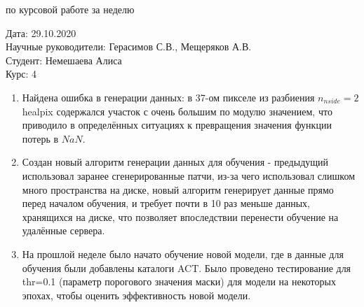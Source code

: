 \documentclass{article}
\begin{document}
\begin{center}{ по курсовой работе за неделю\\}\end{center}
Дата: 29.10.2020\\
Научные руководители: Герасимов С.В., Мещеряков А.В.\\
Студент: Немешаева Алиса\\
Курс: 4\\

\renewcommand{\labelitemi}{$\blacksquare$}
\renewcommand\labelitemii{$\square$}
\begin{enumerate}
    \item Найдена ошибка в генерации данных: в 37-ом пикселе из разбиения $n_{nside}=2$ healpix 
        содержался участок с очень большим по модулю значением, что приводило в определённых 
        ситуациях к превращения значения функции потерь в $NaN$.\\
    \item Создан новый алгоритм генерации данных для обучения - предыдущий использовал заранее 
        сгенерированные патчи, из-за чего использовал слишком много пространства на диске, новый 
        алгоритм генерирует данные прямо перед началом обучения, и требует почти в 10 раз меньше 
        данных, хранящихся на диске, что позволяет впоследствии перенести обучение на удалённые 
        сервера.\\
    \item На прошлой неделе было начато обучение новой модели, где в данные для обучения были 
        добавлены каталоги ACT. Было проведено тестирование для thr=0.1 (параметр порогового 
        значения маски) для модели на некоторых эпохах, чтобы оценить эффективность новой модели.\\


\end{enumerate}
\end{document}
